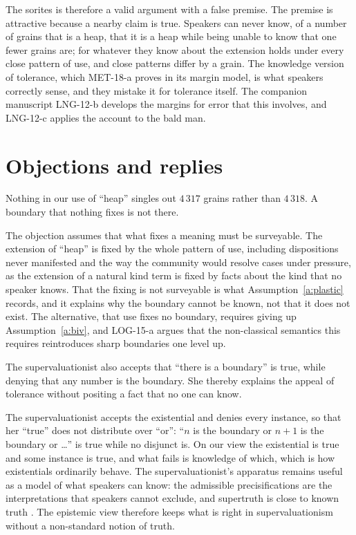 \documentclass{situationist-preprint}
\begin{document}
The sorites is therefore a valid argument with a false premise. The premise is attractive because a nearby claim is true. Speakers can never know, of a number of grains that is a heap, that it is a heap while being unable to know that one fewer grains are; for whatever they know about the extension holds under every close pattern of use, and close patterns differ by a grain. The knowledge version of tolerance, which MET-18-a proves in its margin model, is what speakers correctly sense, and they mistake it for tolerance itself. The companion manuscript LNG-12-b develops the margins for error that this involves, and LNG-12-c applies the account to the bald man.

\section{Objections and replies}\label{s:obj}

\begin{objection}
Nothing in our use of \enquote{heap} singles out $4\,317$ grains rather than $4\,318$. A boundary that nothing fixes is not there.
\end{objection}

\begin{reply}
The objection assumes that what fixes a meaning must be surveyable. The extension of \enquote{heap} is fixed by the whole pattern of use, including dispositions never manifested and the way the community would resolve cases under pressure, as the extension of a natural kind term is fixed by facts about the kind that no speaker knows. That the fixing is not surveyable is what Assumption~\ref{a:plastic} records, and it explains why the boundary cannot be known, not that it does not exist. The alternative, that use fixes no boundary, requires giving up Assumption~\ref{a:biv}, and LOG-15-a argues that the non-classical semantics this requires reintroduces sharp boundaries one level up.
\end{reply}

\begin{objection}[Supervaluationism]
The supervaluationist also accepts that \enquote{there is a boundary} is true, while denying that any number is the boundary. She thereby explains the appeal of tolerance without positing a fact that no one can know.
\end{objection}

\begin{reply}
The supervaluationist accepts the existential and denies every instance, so that her \enquote{true} does not distribute over \enquote{or}: \enquote{$n$ is the boundary or $n+1$ is the boundary or \ldots} is true while no disjunct is. On our view the existential is true and some instance is true, and what fails is knowledge of which, which is how existentials ordinarily behave. The supervaluationist's apparatus remains useful as a model of what speakers can know: the admissible precisifications are the interpretations that speakers cannot exclude, and supertruth is close to known truth \citep{Williamson1994}. The epistemic view therefore keeps what is right in supervaluationism without a non-standard notion of truth.
\end{reply}
\end{document}

